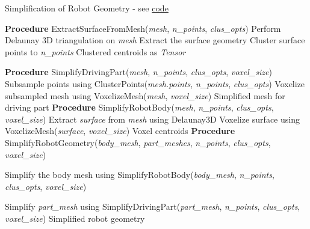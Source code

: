 \documentclass[a4paper,12pt]{article}
\begin{document}
\begin{algorithm}[H]
  \caption{Simplification of Robot Geometry  - see \href{https://github.com/edavidk7/tracked_sim_rl/blob/main/configs/robot_config.py\#L143}{code}}
  \label{alg:mesh_simplification}
  \begin{algorithmic}
    \vspace{0.25cm}
    \STATE \textbf{Procedure} ExtractSurfaceFromMesh(\textit{mesh}, \textit{n\_points}, \textit{clus\_opts})
        \STATE Perform Delaunay 3D triangulation on \textit{mesh}
        \STATE Extract the surface geometry
        \STATE Cluster surface points to \textit{n\_points}
        \RETURN Clustered centroids as \textit{Tensor}
    \vspace{0.25cm}

    \STATE \textbf{Procedure} SimplifyDrivingPart(\textit{mesh}, \textit{n\_points}, \textit{clus\_opts}, \textit{voxel\_size})
        \STATE Subsample points using ClusterPoints(\textit{mesh.points}, \textit{n\_points}, \textit{clus\_opts})
        \STATE Voxelize subsampled mesh using VoxelizeMesh(\textit{mesh}, \textit{voxel\_size})
        \RETURN Simplified mesh for driving part
        \vspace{0.25cm}
    \STATE \textbf{Procedure} SimplifyRobotBody(\textit{mesh}, \textit{n\_points}, \textit{clus\_opts}, \textit{voxel\_size})
        \STATE Extract \textit{surface} from \textit{mesh} using Delaunay3D
        \STATE Voxelize surface using VoxelizeMesh(\textit{surface}, \textit{voxel\_size})
        \RETURN Voxel centroids 
      \vspace{0.25cm}
    \STATE \textbf{Procedure} SimplifyRobotGeometry(\textit{body\_mesh}, \textit{part\_meshes}, \textit{n\_points}, \textit{clus\_opts}, \textit{voxel\_size})

      \STATE Simplify the body mesh using SimplifyRobotBody(\textit{body\_mesh}, \textit{n\_points}, \textit{clus\_opts}, \textit{voxel\_size})

            \STATE Simplify \textit{part\_mesh} using SimplifyDrivingPart(\textit{part\_mesh}, \textit{n\_points}, \textit{clus\_opts}, \textit{voxel\_size})
        \ENDFOR
        \RETURN Simplified robot geometry
        \vspace{0.25cm}
    \end{algorithmic}
    
  \end{algorithm}


\clearpage
\end{document}
